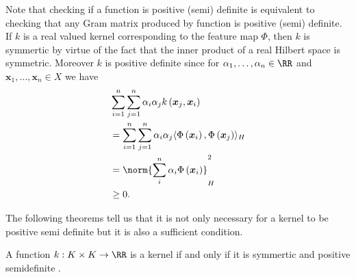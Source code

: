 Note that checking if a function is positive (semi) definite is equivalent to checking that any Gram matrix produced by function is positive (semi) definite. If $k$ is a real valued kernel corresponding to the feature map $\Phi$, then $k$ is symmertic by virtue of the fact that the inner product of a real Hilbert space is symmetric. Moreover $k$ is positive definite since for $\alpha_1 , \ldots , \alpha_n \in \RR$ and $\bm{x}_1 ,\ldots , \bm{x}_n \in X$ we have
\begin{align*}
     & \sum_{i=1}^{n} \sum_{j=1}^{n} \alpha_i \alpha_j k \left( \bm{x}_j , \bm{x}_i \right)                                           \\
     & = \sum_{i=1}^{n} \sum_{j=1}^{n} \alpha_i \alpha_j \langle \Phi \left( \bm{x}_i \right), \Phi \left( \bm{x}_j \right) \rangle_H \\
     & = \norm{ \sum_i^n \alpha_i \Phi \left( \bm{x}_i \right) }_{H}^{2}                                                              \\
     & \geq 0.
\end{align*}

The following theorems tell us that it is not only necessary for a kernel to be positive semi definite but it is also a sufficient condition.

\begin{thm} \label{theorem: nec_and_suf_kernel_1}
    A function $k : K \times K \to \RR$ is a kernel if and only if it is symmertic and positive semidefinite \cite{SteinwartIngo2008SVMb}.
\end{thm}